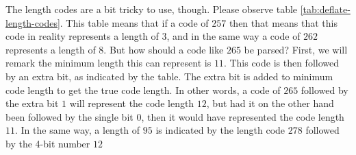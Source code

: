 The length codes are a bit tricky to use, though. Please observe table
\ref{tab:deflate-length-codes}. This table means that if a code of
$257$ then that means that this code in reality represents a length of
$3$, and in the same way a code of $262$ represents a length of
$8$. But how should a code like $265$ be parsed? First, we will remark
the minimum length this can represent is $11$. This code is then
followed by an extra bit, as indicated by the table. The extra bit is
added to minimum code length to get the true code length. In other
words, a code of $265$ followed by the extra bit $1$ will represent
the code length $12$, but had it on the other hand been followed by
the single bit $0$, then it would have represented the code length
$11$. In the same way, a length of $95$ is indicated by the length
code $278$ followed by the 4-bit number $12$

